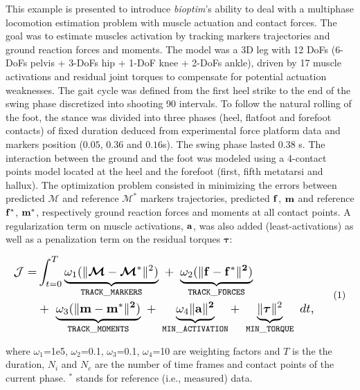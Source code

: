 This example is presented to introduce \textit{bioptim}'s ability to deal with a multiphase locomotion estimation problem with muscle actuation and contact forces.
The goal was to estimate muscles activation by tracking markers trajectories and ground reaction forces and moments. 
The model was a 3D leg with 12 DoFs (6-DoFs pelvis + 3-DoFs hip + 1-DoF knee + 2-DoFs ankle), driven by 17 muscle activations and residual joint torques to compensate for potential actuation weaknesses. 
The gait cycle was defined from the first heel strike to the end of the swing phase discretized into shooting 90 intervals. 
To follow the natural rolling of the foot, the stance was divided into three phases (heel, flatfoot and forefoot contacts) of fixed duration deduced from experimental force platform data and markers position ($0.05$, $0.36$ and $0.16$s).
The swing phase lasted 0.38 s. 
The interaction between the ground and the foot was modeled using a 4-contact points model located at the heel and the forefoot (first, fifth metatarsi and hallux).
The optimization problem consisted in minimizing the errors between predicted $\bm{\mathcal{M}}$ and reference $\bm{\mathcal{M}}^*$ markers trajectories, predicted $\bf{f}$, $\bf{m}$ and reference $\bf{f^*}$, $\bf{m^*}$, respectively ground reaction forces and moments at all contact points.
A regularization term on muscle activations, $\bf{a}$, was also added (least-activations) as well as a penalization term on the residual torques $\boldsymbol{\tau}$:

\[ 
\resizebox{0.9\columnwidth}{!}{$ 
\begin{aligned}
\mathcal{J} = &\int_{t=0}^{T}\underbrace{\omega_1(\|\bm{\mathcal{M}} - \bm{\mathcal{M}}^*\|^{2})}_{\mathtt{TRACK\_MARKERS}}~ 
+ ~ \underbrace{\omega_2(\|\bf{f} - \bf{f}^*\|^{2})}_{\mathtt{TRACK\_FORCES}}\\
&+ ~ \underbrace{\omega_3(\|\bf{m} - \bf{m}^*\|^{2})}_{\mathtt{TRACK\_MOMENTS}}~
+ ~ \underbrace{\omega_4\|\bf{a}\|^2}_{\mathtt{MIN\_ACTIVATION}}
+ ~ \underbrace{\|\boldsymbol{\tau}\|^2}_{\mathtt{MIN\_TORQUE}}~dt, 
\end{aligned}  
$}  
\addtag  
\label{eq:ocp_walk}  
\]

\noindent where $\omega_1$=1e5, $\omega_2$=0.1, $\omega_3$=0.1, $\omega_4$=10 are  weighting factors and $T$ is the the duration, $N_i$ and $N_c$ are the number of time frames and contact points of the current phase. $^*$ stands for reference (i.e., measured) data.\\

